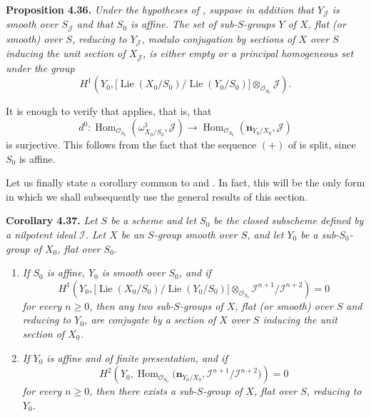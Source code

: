

\medskip
\noindent{}\textbf{Proposition 4.36.}
\textit{Under the hypotheses of , suppose in addition that
\(Y_{\mathscr J}\) is smooth over \(S_{\mathscr J}\) and that \(S_0\)
is affine. The set of sub-\(S\)-groups \(Y\) of \(X\), flat (or smooth)
over \(S\), reducing to \(Y_{\mathscr J}\), modulo conjugation by
sections of \(X\) over \(S\) inducing the unit section of
\(X_{\mathscr J}\), is either empty or a principal homogeneous set under
the group}
\[
 H^1\!\left(
 Y_0,
 \bigl[\operatorname{Lie}(X_0/S_0)/\operatorname{Lie}(Y_0/S_0)\bigr]
 \otimes_{\mathscr O_{S_0}}\mathscr J
 \right).
\]

It is enough to verify that  applies, that is, that
\[
 d^0:
 \operatorname{Hom}_{\mathscr O_{S_0}}
   (\omega^1_{X_0/S_0},\mathscr J)
 \longrightarrow
 \operatorname{Hom}_{\mathscr O_{S_0}}
   (\mathbf n_{Y_0/X_0},\mathscr J)
\]
is surjective. This follows from the fact that the sequence \((+)\) of
 is split, since \(S_0\) is affine.

Let us finally state a corollary common to  and . In fact, this
will be the only form in which we shall subsequently use the general
results of this section.

\medskip
\noindent{}\textbf{Corollary 4.37.}
\textit{Let \(S\) be a scheme and let \(S_0\) be the closed subscheme
defined by a nilpotent ideal \(\mathscr I\). Let \(X\) be an \(S\)-group
smooth over \(S\), and let \(Y_0\) be a sub-\(S_0\)-group of \(X_0\),
flat over \(S_0\).}
\begin{enumerate}
\item[\SGAInlineRefTarget{sga3:iii:corollary:4-37:item:i}(i)] \textit{If \(S_0\) is affine, \(Y_0\) is smooth over \(S_0\),
and if}
\[
 H^1\!\left(
 Y_0,
 \bigl[\operatorname{Lie}(X_0/S_0)/\operatorname{Lie}(Y_0/S_0)\bigr]
 \otimes_{\mathscr O_{S_0}}
 \mathscr I^{n+1}/\mathscr I^{n+2}
 \right)=0
\]
\textit{for every \(n\geq 0\), then any two sub-\(S\)-groups of \(X\),
flat (or smooth) over \(S\) and reducing to \(Y_0\), are conjugate by a
section of \(X\) over \(S\) inducing the unit section of \(X_0\).}

\item[\SGAInlineRefTarget{sga3:iii:corollary:4-37:item:ii}(ii)] \textit{If \(Y_0\) is affine and of finite presentation,
and if}
\[
 H^2\!\left(
 Y_0,
 \operatorname{Hom}_{\mathscr O_{S_0}}
 \bigl(\mathbf n_{Y_0/X_0},
 \mathscr I^{n+1}/\mathscr I^{n+2}\bigr)
 \right)=0
\]
\textit{for every \(n\geq 0\), then there exists a sub-\(S\)-group of
\(X\), flat over \(S\), reducing to \(Y_0\).}
\end{enumerate}

